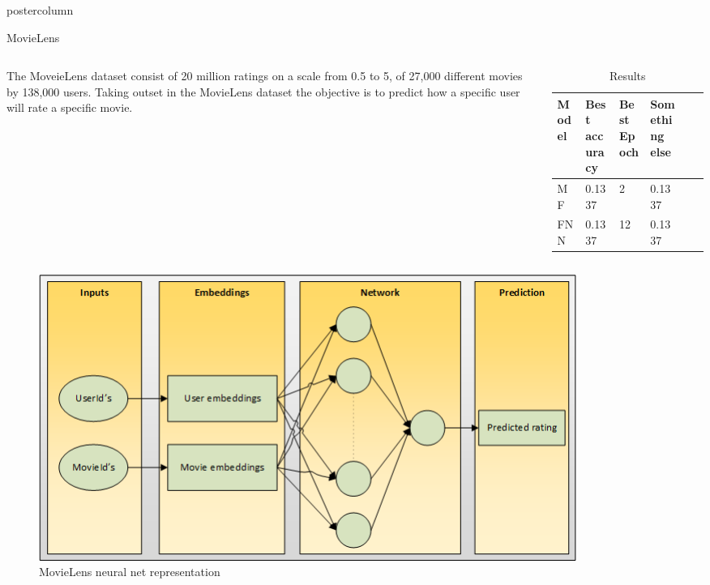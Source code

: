 \documentclass[final,hyperref={pdfpagelabels=false}]{beamer}
\begin{document}
\begin{frame}
\begin{columns}
\begin{column}{.49\paperwidth}
\begin{beamercolorbox}[center,wd=\textwidth]{postercolumn}
\begin{minipage}[T]{.99\textwidth}
{\begin{block}{MovieLens}
\begin{columns}
\begin{column}{1\textwidth}
\begin{minipage}[t]{0.96\textwidth}
\hspace{0.5cm} 
\vspace{-1cm}
\begin{columns}
 \begin{column}{0.45\textwidth}
 \justifying
 \footnotesize{
	The MoveieLens dataset consist of 20 million ratings on a scale from 0.5 to 5, of 27,000 different movies by 138,000 users. Taking outset in the MovieLens dataset the objective is to predict how a specific user will rate a specific movie. }
 \end{column}
 \begin{column}{0.49\textwidth}

\begin{table}[h]
\small
\centering
\caption{Results} 
\label{res:MovieLens_results}
\begin{tabular}{llllll}
\toprule
Model  & Best accuracy        & Best Epoch     & Something else    \\
\midrule
MF  	&  0.1337        & 2       & 0.1337    \\
FNN	  &  0.1337        & 12      & 0.1337    \\
\bottomrule
\end{tabular}
\end{table}

 \end{column}
 \end{columns}
 
 \begin{figure}

\includegraphics[width=0.85\textwidth]{movielensnet.png}
 \caption{MovieLens neural net representation}
\end{figure}  

 \begin{figure}


\end{figure}
\end{minipage}
\end{column}
\end{columns}
\end{block}}
\end{minipage}
\end{beamercolorbox}
\end{column}
\end{columns}
\end{frame}
\end{document}
